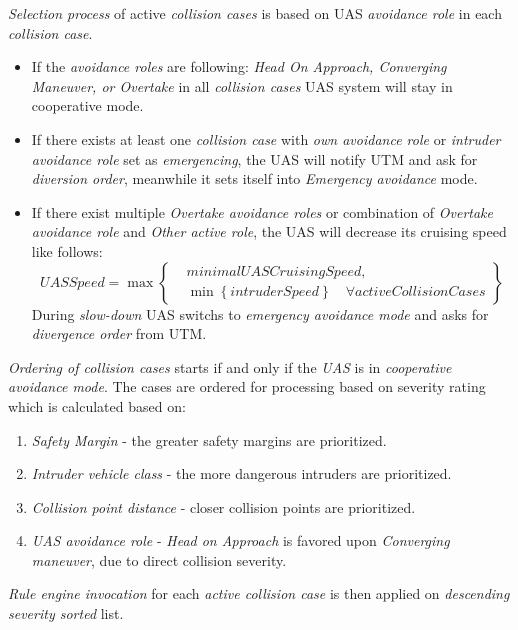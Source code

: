 \emph{Selection process} of active \emph{collision cases} is based on UAS \emph{avoidance role} in each \emph{collision case}.
\begin{itemize}
    \item If the \emph{avoidance roles} are following: \emph{Head On Approach, Converging Maneuver, or Overtake} in all \emph{collision cases} UAS system will stay in cooperative mode.
    \item If there exists at least one \emph{collision case} with \emph{own avoidance role} or \emph{intruder avoidance role} set as \emph{emergencing}, the UAS will notify UTM and ask for \emph{diversion order}, meanwhile it sets itself into \emph{Emergency avoidance} mode.
    \item If there exist multiple \emph{Overtake avoidance roles} or combination of \emph{Overtake avoidance role} and \emph{Other active role}, the UAS will decrease its cruising speed like follows:
    \begin{equation}
        UASSpeed = \max \left\{\begin{aligned}
        & minimalUASCruisingSpeed,\\
        &\min \left\{intruderSpeed\right\}\quad \forall activeCollisionCases
        \end{aligned}
        \right\}
    \end{equation}
    During \emph{slow-down} UAS switchs to \emph{emergency avoidance mode} and asks for \emph{divergence order} from UTM.
\end{itemize}

\emph{Ordering of collision cases} starts if and only if the \emph{UAS} is in \emph{cooperative avoidance mode}. The cases are ordered for processing based on severity rating which is calculated based on:
\begin{enumerate}
    \item \emph{Safety Margin} - the greater safety margins are prioritized.
    \item \emph{Intruder vehicle class} - the more dangerous intruders are prioritized.
    \item \emph{Collision point distance} - closer collision points are prioritized.
    \item \emph{UAS avoidance role} - \emph{Head on Approach} is favored upon \emph{Converging maneuver}, due to direct collision severity.
\end{enumerate}

\emph{Rule engine invocation} for each \emph{active collision case} is then applied on \emph{descending severity sorted} list. 

